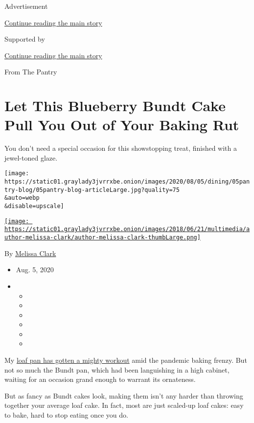Advertisement

\protect\hyperlink{after-top}{Continue reading the main story}

Supported by

\protect\hyperlink{after-sponsor}{Continue reading the main story}

From The Pantry

\hypertarget{let-this-blueberry-bundt-cake-pull-you-out-of-your-baking-rut}{%
\section{Let This Blueberry Bundt Cake Pull You Out of Your Baking
Rut}\label{let-this-blueberry-bundt-cake-pull-you-out-of-your-baking-rut}}

You don't need a special occasion for this showstopping treat, finished
with a jewel-toned glaze.

\texttt{[image: https://static01.graylady3jvrrxbe.onion/images/2020/08/05/dining/05pantry-blog/05pantry-blog-articleLarge.jpg?quality=75\\\&auto=webp\\\&disable=upscale]}

\href{https://www.nytimes3xbfgragh.onion/by/melissa-clark}{\texttt{[image: https://static01.graylady3jvrrxbe.onion/images/2018/06/21/multimedia/author-melissa-clark/author-melissa-clark-thumbLarge.png]}}

By \href{https://www.nytimes3xbfgragh.onion/by/melissa-clark}{Melissa
Clark}

\begin{itemize}
\item
  Aug. 5, 2020
\item
  \begin{itemize}
  \item
  \item
  \item
  \item
  \item
  \item
  \end{itemize}
\end{itemize}

My
\href{https://www.nytimes3xbfgragh.onion/2020/04/03/dining/pantry-poundcake-coronavirus.html}{loaf
pan has gotten a mighty workout} amid the pandemic baking frenzy. But
not so much the Bundt pan, which had been languishing in a high cabinet,
waiting for an occasion grand enough to warrant its ornateness.

But as fancy as Bundt cakes look, making them isn't any harder than
throwing together your average loaf cake. In fact, most are just
scaled-up loaf cakes: easy to bake, hard to stop eating once you do.

